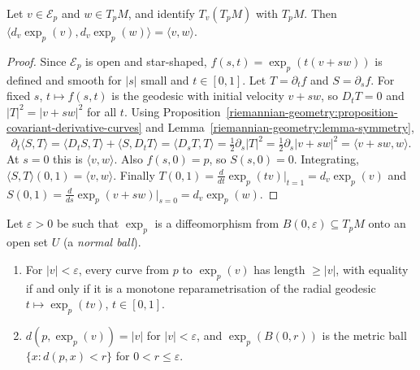\begin{theorem}\label{riemannian-geometry:theorem-gauss-lemma}
Let $v \in \mathcal{E}_p$ and $w \in T_pM$, and identify $T_v(T_pM)$ with $T_pM$. Then $\langle d_v\exp_p(v), d_v\exp_p(w)\rangle = \langle v, w\rangle$.
\end{theorem}

\begin{proof}
Since $\mathcal{E}_p$ is open and star-shaped, $f(s, t) = \exp_p(t(v + sw))$ is defined and smooth for $|s|$ small and $t \in [0, 1]$. Let $T = \partial_tf$ and $S = \partial_sf$. For fixed $s$, $t \mapsto f(s, t)$ is the geodesic with initial
velocity $v + sw$, so $D_tT = 0$ and $|T|^2 = |v + sw|^2$ for all $t$. Using Proposition~\ref{riemannian-geometry:proposition-covariant-derivative-curves} and Lemma~\ref{riemannian-geometry:lemma-symmetry},
\[
\partial_t\langle S, T\rangle = \langle D_tS, T\rangle + \langle S, D_tT\rangle = \langle D_sT, T\rangle = \tfrac12\partial_s|T|^2 = \tfrac12\partial_s|v + sw|^2 = \langle v + sw, w\rangle.
\]
At $s = 0$ this is $\langle v, w\rangle$. Also $f(s, 0) = p$, so $S(s, 0) = 0$. Integrating, $\langle S, T\rangle(0, 1) = \langle v, w\rangle$. Finally $T(0, 1) = \frac{d}{dt}\exp_p(tv)|_{t=1} = d_v\exp_p(v)$ and
$S(0, 1) = \frac{d}{ds}\exp_p(v + sw)|_{s=0} = d_v\exp_p(w)$.
\end{proof}

\begin{theorem}\label{riemannian-geometry:theorem-local-minimisation}
Let $\varepsilon > 0$ be such that $\exp_p$ is a diffeomorphism from $B(0, \varepsilon) \subseteq T_pM$ onto an open set $U$ (a \emph{normal ball}).
\begin{enumerate}
\item For $|v| < \varepsilon$, every curve from $p$ to $\exp_p(v)$ has length $\geq |v|$, with equality if and only if it is a monotone reparametrisation of the radial geodesic $t \mapsto \exp_p(tv)$, $t \in [0, 1]$.
\item $d(p, \exp_p(v)) = |v|$ for $|v| < \varepsilon$, and $\exp_p(B(0, r))$ is the metric ball $\{x : d(p, x) < r\}$ for $0 < r \leq \varepsilon$.
\end{enumerate}
\end{theorem}

